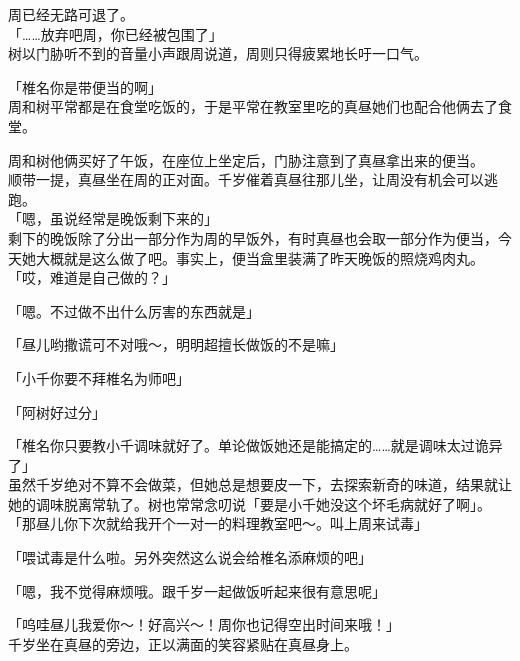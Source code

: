周已经无路可退了。\\

「……放弃吧周，你已经被包围了」\\

树以门胁听不到的音量小声跟周说道，周则只得疲累地长吁一口气。\\

\vspace{2\baselineskip}

「椎名你是带便当的啊」\\

周和树平常都是在食堂吃饭的，于是平常在教室里吃的真昼她们也配合他俩去了食堂。

周和树他俩买好了午饭，在座位上坐定后，门胁注意到了真昼拿出来的便当。\\

顺带一提，真昼坐在周的正对面。千岁催着真昼往那儿坐，让周没有机会可以逃跑。\\

「嗯，虽说经常是晚饭剩下来的」\\

剩下的晚饭除了分出一部分作为周的早饭外，有时真昼也会取一部分作为便当，今天她大概就是这么做了吧。事实上，便当盒里装满了昨天晚饭的照烧鸡肉丸。\\

「哎，难道是自己做的？」

「嗯。不过做不出什么厉害的东西就是」

「昼儿哟撒谎可不对哦～，明明超擅长做饭的不是嘛」

「小千你要不拜椎名为师吧」

「阿树好过分」

「椎名你只要教小千调味就好了。单论做饭她还是能搞定的……就是调味太过诡异了」\\

虽然千岁绝对不算不会做菜，但她总是想要皮一下，去探索新奇的味道，结果就让她的调味脱离常轨了。树也常常念叨说「要是小千她没这个坏毛病就好了啊」。\\

「那昼儿你下次就给我开个一对一的料理教室吧～。叫上周来试毒」

「喂试毒是什么啦。另外突然这么说会给椎名添麻烦的吧」

「嗯，我不觉得麻烦哦。跟千岁一起做饭听起来很有意思呢」

「呜哇昼儿我爱你～！好高兴～！周你也记得空出时间来哦！」\\

千岁坐在真昼的旁边，正以满面的笑容紧贴在真昼身上。

